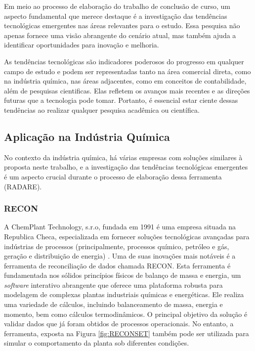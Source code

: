 Em meio ao processo de elaboração do trabalho de conclusão de curso, um aspecto fundamental que merece destaque é a investigação das tendências tecnológicas emergentes nas áreas relevantes para o estudo. Essa pesquisa não apenas fornece uma visão abrangente do cenário atual, mas também ajuda a identificar oportunidades para inovação e melhoria.

As tendências tecnológicas são indicadores poderosos do progresso em qualquer campo de estudo e podem ser representadas tanto na área comercial direta, como na indústria química, nas áreas adjacentes, como em conceitos de contabilidade, além de pesquisas cientificas. Elas refletem os avanços mais recentes e as direções futuras que a tecnologia pode tomar. Portanto, é essencial estar ciente dessas tendências ao realizar qualquer pesquisa acadêmica ou científica.

\subsection{Aplicação na Indústria Química}

No contexto da indústria química, há várias empresas com soluções similares à proposta neste trabalho, e a investigação das tendências tecnológicas emergentes é um aspecto crucial durante o processo de elaboração dessa ferramenta (RADARE). 

\subsubsection{RECON}

A ChemPlant Technology, s.r.o, fundada em 1991 é uma empresa situada na Republica Checa, especializada em fornecer soluções tecnológicas avançadas para indústrias de processos (principalmente, processos químico, petróleo e gás, geração e distribuição de energia) \cite{reconset}. Uma de suas inovações mais notáveis é a ferramenta de reconciliação de dados chamada RECON. Esta ferramenta é fundamentada nos sólidos princípios físicos de balanço de massa e energia, um \textit{software} interativo abrangente que oferece uma plataforma robusta para modelagem de complexas plantas industriais químicas e energéticas. Ele realiza uma variedade de cálculos, incluindo balanceamento de massa, energia e momento, bem como cálculos termodinâmicos. O principal objetivo da solução é validar dados que já foram obtidos de processos operacionais. No entanto, a ferramenta, exposta na Figura \ref{fig:RECONSET} também pode ser utilizada para simular o comportamento da planta sob diferentes condições.

